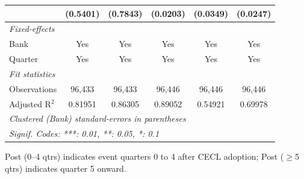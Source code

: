 \begin{tabular}{lccccc}
                                                                          & (0.5401)                      & (0.7843)                    & (0.0203)              & (0.0349)       & (0.0247)\\   
   \midrule
   \emph{Fixed-effects}\\
   Bank                                                                   & Yes                           & Yes                         & Yes                   & Yes            & Yes\\  
   Quarter                                                                & Yes                           & Yes                         & Yes                   & Yes            & Yes\\  
   \midrule
   \emph{Fit statistics}\\
   Observations                                                           & 96,433                        & 96,433                      & 96,446                & 96,446         & 96,446\\  
   Adjusted R$^2$                                                         & 0.81951                       & 0.86305                     & 0.89052               & 0.54921        & 0.69978\\  
   \midrule \midrule
   \multicolumn{6}{l}{\emph{Clustered (Bank) standard-errors in parentheses}}\\
   \multicolumn{6}{l}{\emph{Signif. Codes: ***: 0.01, **: 0.05, *: 0.1}}\\
\end{tabular}
 
\par \raggedright 
Post (0--4 qtrs) indicates event quarters 0 to 4 after CECL adoption; Post ($\geq$5 qtrs) indicates quarter 5 onward.
\par\endgroup


